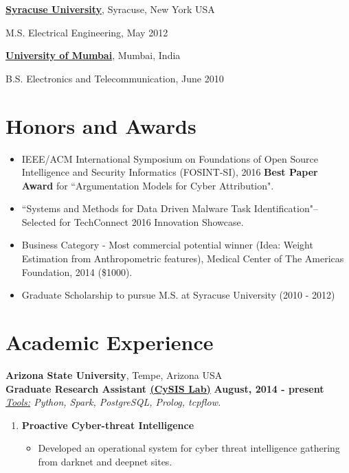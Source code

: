 \documentclass[margin,line]{CV}
\newenvironment{list1}{
  \begin{list}{\ding{113}}{%
      \setlength{\itemsep}{0in}
      \setlength{\parsep}{0in} \setlength{\parskip}{0in}
      \setlength{\topsep}{0in} \setlength{\partopsep}{0in} 
      \setlength{\leftmargin}{0.17in}}}{\end{list}}
\begin{document}
\begin{resume}
\href{http://www.syr.edu/}{\bf Syracuse University}, Syracuse, New York USA\\
\vspace*{-.1in}
\begin{list1}
\item[] M.S. Electrical Engineering,  May 2012
\end{list1}

\href{http://archive.mu.ac.in/}{\bf University of Mumbai}, Mumbai, India\\
\vspace*{-.1in}
\begin{list1}
\item[] B.S. Electronics and Telecommunication,  June 2010
\end{list1}


\section{\sc Honors and Awards} 
\begin{itemize}[leftmargin =*]

\item IEEE/ACM International Symposium on Foundations of Open Source Intelligence and Security Informatics (FOSINT-SI), 2016 \textbf{Best Paper Award} for ``Argumentation Models for Cyber Attribution". 

\item ``Systems and Methods for Data Driven Malware Task Identification"-- Selected for TechConnect
2016 Innovation Showcase.

\item Business Category - Most commercial potential winner (Idea: Weight Estimation from Anthropometric features), Medical Center of The Americas Foundation, 2014 (\$1000).

\item Graduate Scholarship to pursue M.S. at Syracuse University (2010 - 2012)
\end{itemize}
\section{\sc Academic Experience}
{\bf Arizona State University}, Tempe, Arizona USA\\
{\bf Graduate Research Assistant \href{http://cysis.engineering.asu.edu/}{(CySIS Lab)}} \hfill {\bf August, 2014 - present}\\
\textit{\underline{Tools:} Python, Spark, PostgreSQL, Prolog, tcpflow.}\\
\begin{enumerate}
	\item {\bf{Proactive Cyber-threat Intelligence}} 
	\begin{itemize}
		\item Developed an operational system for cyber threat intelligence gathering from darknet and deepnet sites. 
		

\end{itemize}
\end{enumerate}
\end{resume}
\end{document}
